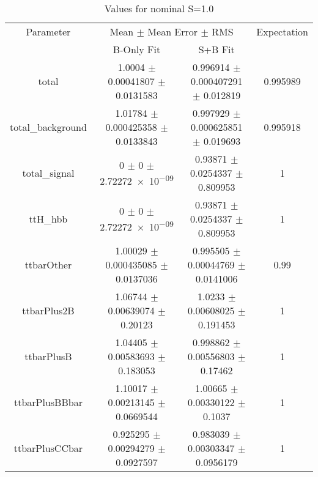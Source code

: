\begin{table}
\centering
\caption{Values for nominal S=1.0}
\begin{tabular}{cccc}
\toprule
Parameter & \multicolumn{2}{c}{Mean $\pm$ Mean Error $\pm$ RMS} & Expectation\\
 & B-Only Fit & S+B Fit & \\
\midrule
total & \num{1.0004} $\pm$ \num{0.00041807} $\pm$ \num{0.0131583} & \num{0.996914} $\pm$ \num{0.000407291} $\pm$ \num{0.012819} & \num{0.995989}\\
total\_background & \num{1.01784} $\pm$ \num{0.000425358} $\pm$ \num{0.0133843} & \num{0.997929} $\pm$ \num{0.000625851} $\pm$ \num{0.019693} & \num{0.995918}\\
total\_signal & \num{0} $\pm$ \num{0} $\pm$ \num{2.72272e-09} & \num{0.93871} $\pm$ \num{0.0254337} $\pm$ \num{0.809953} & \num{1}\\
ttH\_hbb & \num{0} $\pm$ \num{0} $\pm$ \num{2.72272e-09} & \num{0.93871} $\pm$ \num{0.0254337} $\pm$ \num{0.809953} & \num{1}\\
ttbarOther & \num{1.00029} $\pm$ \num{0.000435085} $\pm$ \num{0.0137036} & \num{0.995505} $\pm$ \num{0.00044769} $\pm$ \num{0.0141006} & \num{0.99}\\
ttbarPlus2B & \num{1.06744} $\pm$ \num{0.00639074} $\pm$ \num{0.20123} & \num{1.0233} $\pm$ \num{0.00608025} $\pm$ \num{0.191453} & \num{1}\\
ttbarPlusB & \num{1.04405} $\pm$ \num{0.00583693} $\pm$ \num{0.183053} & \num{0.998862} $\pm$ \num{0.00556803} $\pm$ \num{0.17462} & \num{1}\\
ttbarPlusBBbar & \num{1.10017} $\pm$ \num{0.00213145} $\pm$ \num{0.0669544} & \num{1.00665} $\pm$ \num{0.00330122} $\pm$ \num{0.1037} & \num{1}\\
ttbarPlusCCbar & \num{0.925295} $\pm$ \num{0.00294279} $\pm$ \num{0.0927597} & \num{0.983039} $\pm$ \num{0.00303347} $\pm$ \num{0.0956179} & \num{1}\\
\bottomrule
\end{tabular}
\end{table}